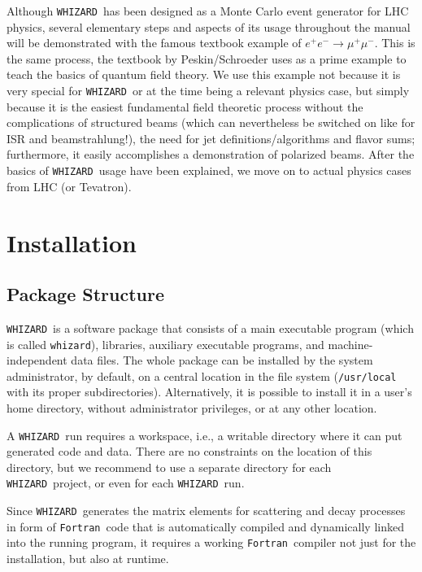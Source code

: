 \documentclass[12pt]{book}
\newcommand{\ttt}[1]{\texttt{#1}}
\newcommand{\whizard}{\ttt{WHIZARD}}
\newcommand{\fortran}{\ttt{Fortran}}
\begin{document}
Although \whizard\ has been designed as a Monte Carlo event generator
for LHC physics, several elementary steps and aspects of its usage
throughout the manual will be demonstrated with the famous textbook
example of $e^+e^- \to \mu^+ \mu^-$. This is the same process, the
textbook by Peskin/Schroeder \cite{PeskinSchroeder} uses as a prime
example to teach the basics of quantum field theory. We use this
example not because it is very special for \whizard\ or at the time
being a relevant physics case, but simply because it is the easiest
fundamental field theoretic process without the complications of
structured beams (which can nevertheless be switched on like for ISR
and beamstrahlung!), the need for jet definitions/algorithms and
flavor sums; furthermore, it easily accomplishes a demonstration of
polarized beams. After the basics of \whizard\ usage have been
explained, we move on to actual physics cases from LHC (or Tevatron).


\newpage
\chapter{Installation}
\label{chap:installation}

\section{Package Structure}

\whizard\ is a software package that consists of a main executable
program (which is called \ttt{whizard}), libraries, auxiliary
executable programs, and machine-independent data files.  The whole
package can be installed by the system administrator, by default, on a
central location in the file system (\ttt{/usr/local} with its proper
subdirectories).  Alternatively, it is possible to install it in a
user's home directory, without administrator privileges, or at any
other location.

A \whizard\ run requires a workspace, i.e., a writable directory where
it can put generated code and data.  There are no constraints on the
location of this directory, but we recommend to use a separate
directory for each \whizard\ project, or even for each \whizard\ run.

Since \whizard\ generates the matrix elements for scattering and decay
processes in form of \fortran\ code that is automatically compiled and
dynamically linked into the running program, it requires a working
\fortran\ compiler not just for the installation, but also at runtime.
\end{document}

